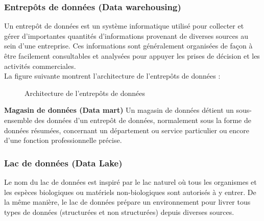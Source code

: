 \documentclass{report}
\begin{document}
\subsubsection{Entrepôts de données (Data warehousing)}
Un entrepôt de données est un système informatique utilisé pour collecter et gérer d'importantes quantités d'informations provenant de diverses sources au sein d'une entreprise. Ces informations sont généralement organisées de façon à être facilement consultables et analysées pour appuyer les prises de décision et les activités commerciales.\\
La figure suivante montrent l'architecture de l'entrepôts de données :
  \begin{figure}[h]
        \centering
        \caption{Architecture de l'entrepôts de données \cite{Cécile Favre et al.,January 2013}}
        \label{f}
    \end{figure}
    
    
 \textbf{Magasin de données (Data mart)} 
Un magasin de données détient un sous-ensemble des données d'un entrepôt de données, normalement sous la forme de données résumées, concernant un département ou service particulier ou encore d'une fonction professionnelle précise.

\subsubsection{ Lac de données (Data Lake)}
Le nom du lac de données est inspiré par le lac naturel où tous les organismes et les espèces biologiques ou matériels non-biologiques sont autorisés à y entrer. De la même manière, le lac de données prépare un environnement pour livrer tous types de données (structurées et non structurées) depuis diverses sources. \cite{Marzieh Derakhshannia,2022} \\
\end{document}
